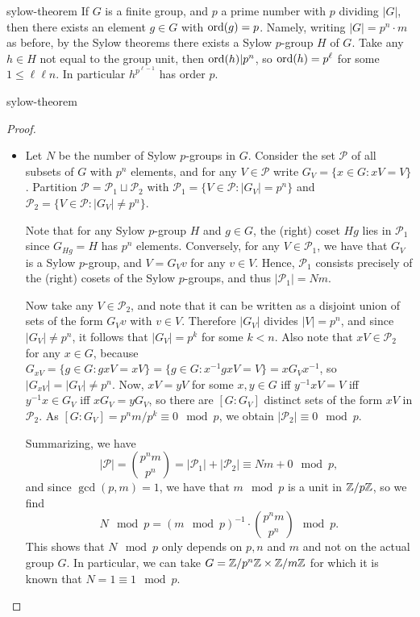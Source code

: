 \begin{example}{sylow-theorem}
    If $G$ is a finite group, and $p$ a prime number with $p$ dividing $|G|$, then there exists an element $g \in G$ with $\textup{ord}(g) = p$. Namely, writing $|G| = p^n \cdot m$ as before, by the Sylow theorems there exists a Sylow $p$-group $H$ of $G$. Take any $h \in H$ not equal to the group unit, then $\textup{ord}(h) | p^n$, so $\textup{ord}(h) = p^\ell$ for some $1 \le \ell \ell n$. In particular $h^{p^{\ell - 1}}$ has order $p$.
\end{example}

\begin{example}{sylow-theorem}
    \begin{proof}
    \begin{itemize}
        \item Let $N$ be the number of Sylow $p$-groups in $G$. Consider the set $\mathcal{P}$ of all subsets of $G$ with $p^n$ elements, and for any $V \in \mathcal{P}$ write $G_V = \{ x \in G : xV = V \}$. Partition $\mathcal{P} = \mathcal{P}_1 \sqcup \mathcal{P}_2$ with $\mathcal{P}_1 = \{ V \in \mathcal{P} : |G_V| = p^n \}$ and $\mathcal{P}_2 = \{ V \in \mathcal{P} : |G_V| \ne p^n \}$.
    
        Note that for any Sylow $p$-group $H$ and $g \in G$, the (right) coset $Hg$ lies in $\mathcal{P}_1$ since $G_{Hg} = H$ has $p^n$ elements. Conversely, for any $V \in \mathcal{P}_1$, we have that $G_V$ is a Sylow $p$-group, and $V = G_V v$ for any $v \in V$. Hence, $\mathcal{P}_1$ consists precisely of the (right) cosets of the Sylow $p$-groups, and thus $|\mathcal{P}_1| = N m$.
    
        Now take any $V \in \mathcal{P}_2$, and note that it can be written as a disjoint union of sets of the form $G_V v$ with $v \in V$. Therefore $|G_V|$ divides $|V| = p^n$, and since $|G_V| \ne p^n$, it follows that $|G_V| = p^k$ for some $k < n$. Also note that $xV \in \mathcal{P}_2$ for any $x \in G$, because $G_{xV} = \{ g \in G : gxV = xV \} = \{ g \in G : x^{-1} g x V = V \} = x G_V x^{-1}$, so $|G_{xV}| = |G_V| \ne p^n$. Now, $xV = yV$ for some $x, y \in G$ iff $y^{-1} x V = V$ iff $y^{-1} x \in G_V$ iff $x G_V = y G_V$, so there are $[G : G_V]$ distinct sets of the form $xV$ in $\mathcal{P}_2$. As $[G : G_V] = p^n m / p^k \equiv 0 \mod p$, we obtain $|\mathcal{P}_2| \equiv 0 \mod p$.
    
        Summarizing, we have
        \[ |\mathcal{P}| = \binom{p^n m}{p^n} = |\mathcal{P}_1| + |\mathcal{P}_2| \equiv Nm + 0 \mod p , \]
        and since $\gcd(p, m) = 1$, we have that $m \mod p$ is a unit in $\mathbb{Z}/p\mathbb{Z}$, so we find
        \[ N \mod p = (m \mod p)^{-1} \cdot \binom{p^n m}{p^n} \mod p . \]
        This shows that $N \mod p$ only depends on $p, n$ and $m$ and not on the actual group $G$. In particular, we can take $G = \mathbb{Z}/p^n \mathbb{Z} \times \mathbb{Z}/m\mathbb{Z}$ for which it is known that $N = 1 \equiv 1 \mod p$.
    

\end{itemize}
\end{proof}
\end{example}
